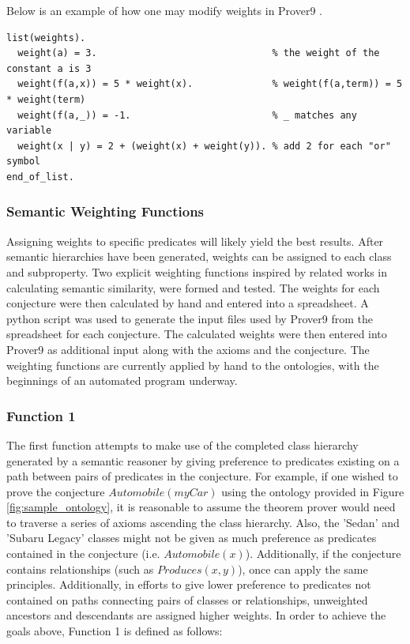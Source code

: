 \documentclass{article}
\begin{document}
Below is an example of how one may modify weights in Prover9  \cite{mccune2005prover9}. 

\begin{singlespace}
\centering
\begin{verbatim}
list(weights).
  weight(a) = 3.                               % the weight of the constant a is 3
  weight(f(a,x)) = 5 * weight(x).              % weight(f(a,term)) = 5 * weight(term)
  weight(f(a,_)) = -1.                         % _ matches any variable
  weight(x | y) = 2 + (weight(x) + weight(y)). % add 2 for each "or" symbol
end_of_list.
\end{verbatim}
\end{singlespace}

\subsubsection{Semantic Weighting Functions}
Assigning weights to specific predicates will likely yield the best results. After semantic hierarchies have been generated, weights can be assigned to each class and subproperty. Two explicit weighting functions inspired by related works in calculating semantic similarity, were formed and tested. The weights for each conjecture were then calculated by hand and entered into a spreadsheet. A python script was used to generate the input files used by Prover9 from the spreadsheet for each conjecture. The calculated weights were then entered into Prover9 as additional input along with the axioms and the conjecture. The weighting functions are currently applied by hand to the ontologies, with the beginnings of an automated program underway. 

\subsubsection{Function 1} 

The first function attempts to make use of the completed class hierarchy generated by a semantic reasoner by giving preference to predicates existing on a path between pairs of predicates in the conjecture. For example, if one wished to prove the conjecture $Automobile(myCar)$ using the ontology provided in Figure \ref{fig:sample_ontology}, it is reasonable to assume the theorem prover would need to traverse a series of axioms ascending the class hierarchy. Also, the 'Sedan' and 'Subaru Legacy' classes might not be given as much preference as predicates contained in the conjecture (i.e. $Automobile(x)$). Additionally, if the conjecture contains relationships (such as $Produces(x,y)$), once can apply the same principles. Additionally, in efforts to give lower preference to predicates not contained on paths connecting pairs of classes or relationships, unweighted ancestors and descendants are assigned higher weights. In order to achieve the goals above, Function 1 is defined as follows: 
\end{document}
